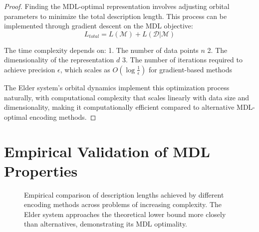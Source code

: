 \begin{proof}
Finding the MDL-optimal representation involves adjusting orbital parameters to minimize the total description length. This process can be implemented through gradient descent on the MDL objective:
\begin{equation}
L_{total} = L(\mathcal{M}) + L(\mathcal{D} | \mathcal{M})
\end{equation}

The time complexity depends on:
1. The number of data points $n$
2. The dimensionality of the representation $d$
3. The number of iterations required to achieve precision $\epsilon$, which scales as $O(\log \frac{1}{\epsilon})$ for gradient-based methods

The Elder system's orbital dynamics implement this optimization process naturally, with computational complexity that scales linearly with data size and dimensionality, making it computationally efficient compared to alternative MDL-optimal encoding methods.
\end{proof}

\section{Empirical Validation of MDL Properties}

\begin{figure}[h]
\centering
{}
\caption{Empirical comparison of description lengths achieved by different encoding methods across problems of increasing complexity. The Elder system approaches the theoretical lower bound more closely than alternatives, demonstrating its MDL optimality.}
\label{fig:mdl_comparison}
\end{figure}

